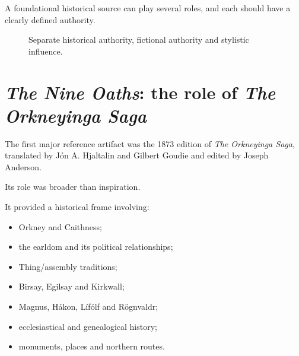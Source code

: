 \documentclass[11pt,oneside,openany]{book}
\providecommand{\tightlist}{%
  \setlength{\itemsep}{0pt}\setlength{\parskip}{0pt}}
\begin{document}
A foundational historical source can play several roles, and each should have a clearly defined authority.

\begin{figure}[htbp]
\centering
{}
\caption{Separate historical authority, fictional authority and stylistic influence.}
\end{figure}

\section{\texorpdfstring{\emph{The Nine Oaths}: the role of \emph{The Orkneyinga Saga}}{The Nine Oaths: the role of The Orkneyinga Saga}}\label{the-nine-oaths-the-role-of-the-orkneyinga-saga}

The first major reference artifact was the 1873 edition of \emph{The Orkneyinga Saga}, translated by Jón A. Hjaltalin and Gilbert Goudie and edited by Joseph Anderson.

Its role was broader than inspiration.

It provided a historical frame involving:

\begin{itemize}
\tightlist
\item
  Orkney and Caithness;
\item
  the earldom and its political relationships;
\item
  Thing/assembly traditions;
\item
  Birsay, Egilsay and Kirkwall;
\item
  Magnus, Hákon, Lífólf and Rögnvaldr;
\item
  ecclesiastical and genealogical history;
\item
  monuments, places and northern routes.
\end{itemize}
\end{document}
